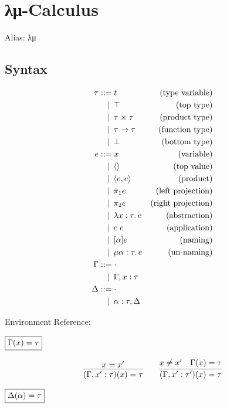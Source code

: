 \section{λμ-Calculus}

Alias: λμ

\subsection{Syntax}

\begin{align*}
  \tau
  &\BNFassign t &(\text{type variable}) \\
  &\BNFor \top &(\text{top type}) \\
  &\BNFor \tau \multi \tau &(\text{product type}) \\
  &\BNFor \tau \to \tau &(\text{function type}) \\
  &\BNFor \bot &(\text{bottom type}) \\
  e
  &\BNFassign x &(\text{variable}) \\
  &\BNFor \langle\rangle &(\text{top value}) \\
  &\BNFor \langle e, e\rangle &(\text{product}) \\
  &\BNFor \pi_1 e &(\text{left projection}) \\
  &\BNFor \pi_2 e &(\text{right projection}) \\
  &\BNFor \lambda x: \tau\ldotp e &(\text{abstraction}) \\
  &\BNFor e\; e &(\text{application}) \\
  &\BNFor [\alpha] e &(\text{naming}) \\
  &\BNFor \mu \alpha: \tau\ldotp e &(\text{un-naming}) \\
  \Gamma
  &\BNFassign \cdot \\
  &\BNFor \Gamma, x: \tau \\
  \Delta
  &\BNFassign \cdot \\
  &\BNFor \alpha: \tau, \Delta
\end{align*}

Environment Reference:

$\fbox{$\Gamma(x) = \tau$}$

\begin{gather*}
  \infer{(\Gamma, x': \tau)(x) = \tau}{
    x = x'
  }
  \hspace{2em}
  \infer{(\Gamma, x': \tau')(x) = \tau}{
    x \neq x'
    &
    \Gamma(x) = \tau
  }
\end{gather*}

$\fbox{$\Delta(\alpha) = \tau$}$

